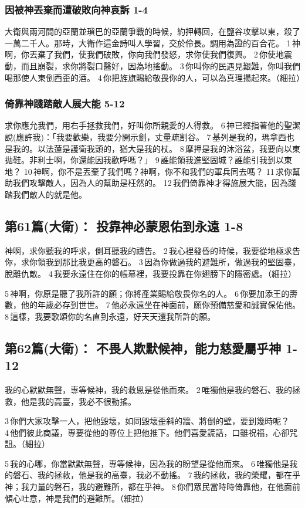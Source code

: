 \subsubsection{因被神丟棄而遭破敗向神哀訴 1-4}
大衛與兩河間的亞蘭並瑣巴的亞蘭爭戰的時候，約押轉回，在鹽谷攻擊以東，殺了一萬二千人。那時，大衛作這金詩叫人學習，交於伶長。調用為證的百合花。
1 神啊，你丟棄了我們，使我們破敗，你向我們發怒，求你使我們復興。
2 你使地震動，而且崩裂，求你將裂口醫好，因為地搖動。
3 你叫你的民遇見艱難，你叫我們喝那使人東倒西歪的酒。
4 你把旌旗賜給敬畏你的人，可以為真理揚起來。（細拉）
\subsubsection{倚靠神踐踏敵人展大能 5-12}
求你應允我們，用右手拯救我們，好叫你所親愛的人得救。
6 神已經指著他的聖潔說(應許我)：「我要歡樂，我要分開示劍，丈量疏割谷。
7 基列是我的，瑪拿西也是我的。以法蓮是護衛我頭的，猶大是我的杖。
8 摩押是我的沐浴盆，我要向以東拋鞋。非利士啊，你還能因我歡呼嗎？」
9 誰能領我進堅固城？誰能引我到以東地？
10 神啊，你不是丟棄了我們嗎？神啊，你不和我們的軍兵同去嗎？
11 求你幫助我們攻擊敵人，因為人的幫助是枉然的。
12 我們倚靠神才得施展大能，因為踐踏我們敵人的就是他。

\subsection{第61篇(大衛)： 投靠神必蒙恩佑到永遠 1-8}
神啊，求你聽我的呼求，側耳聽我的禱告。
2 我心裡發昏的時候，我要從地極求告你，求你領我到那比我更高的磐石。
3 因為你做過我的避難所，做過我的堅固臺，脫離仇敵。
4 我要永遠住在你的帳幕裡，我要投靠在你翅膀下的隱密處。（細拉）

5 神啊，你原是聽了我所許的願；你將產業賜給敬畏你名的人。
6 你要加添王的壽數，他的年歲必存到世世。
7 他必永遠坐在神面前，願你預備慈愛和誠實保佑他。
8 這樣，我要歌頌你的名直到永遠，好天天還我所許的願。

\subsection{第62篇(大衛)： 不畏人欺默候神，能力慈愛屬乎神 1-12}
我的心默默無聲，專等候神，我的救恩是從他而來。
2 唯獨他是我的磐石、我的拯救，他是我的高臺，我必不很動搖。

3 你們大家攻擊一人，把他毀壞，如同毀壞歪斜的牆、將倒的壁，要到幾時呢？
4 他們彼此商議，專要從他的尊位上把他推下。他們喜愛謊話，口雖祝福，心卻咒詛。（細拉）

5 我的心哪，你當默默無聲，專等候神，因為我的盼望是從他而來。
6 唯獨他是我的磐石、我的拯救，他是我的高臺，我必不動搖。
7 我的拯救，我的榮耀，都在乎神；我力量的磐石，我的避難所，都在乎神。
8 你們眾民當時時倚靠他，在他面前傾心吐意，神是我們的避難所。（細拉）

